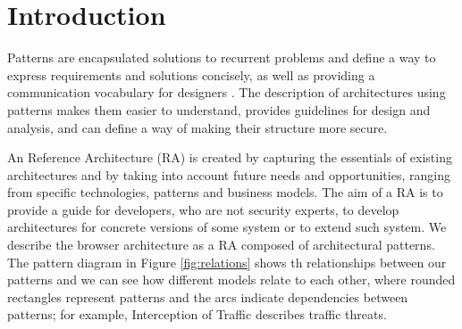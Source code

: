\documentclass[prodmode,acmtecs]{acmsmall}
\begin{document}
%
%






\maketitle
\section{Introduction}
Patterns are encapsulated solutions to recurrent problems and define a way to express requirements and solutions concisely, as well as providing a communication vocabulary for designers \cite{gamma1994design,buschman1996system}. The description of architectures using patterns makes them easier to understand, provides guidelines for design and analysis, and can define a way of making their structure more secure.

 An Reference Architecture (RA) is created by capturing the essentials of existing architectures and by taking into account future needs and opportunities, ranging from specific technologies, patterns and business models. The aim of a RA is to provide a guide for developers, who are not security experts, to develop architectures for concrete versions of some system or to extend such system. We describe the browser architecture as a RA composed  of architectural patterns. The pattern diagram \cite{buschman1996system} in Figure \ref{fig:relations} shows th relationships between our patterns and we can see how different models relate to each other, where rounded rectangles represent patterns and the arcs indicate dependencies between patterns; for example, Interception of Traffic describes traffic threats.
\end{document}
